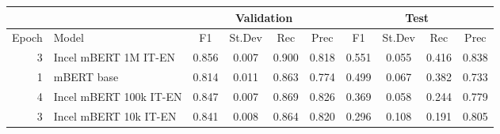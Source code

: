 \begin{tabular}{rl|cccc|cccc}
    \hline
                  &                    &  \multicolumn{4}{c|}{Validation}              & \multicolumn{4}{c}{Test} \\
    \hline
            Epoch &              Model &      F1 &      St.Dev &   Rec & Prec &       F1 &       St.Dev &  Rec   &  Prec \\
    \hline
    3 &   Incel mBERT 1M IT-EN &   0.856 &          0.007 &    0.900 &     0.818 &    0.551 &           0.055 &     0.416 &      0.838 \\
    1 &             mBERT base &   0.814 &          0.011 &    0.863 &     0.774 &    0.499 &           0.067 &     0.382 &      0.733 \\
    4 & Incel mBERT 100k IT-EN &   0.847 &          0.007 &    0.869 &     0.826 &    0.369 &           0.058 &     0.244 &      0.779 \\
    3 &  Incel mBERT 10k IT-EN &   0.841 &          0.008 &    0.864 &     0.820 &    0.296 &           0.108 &     0.191 &      0.805 \\
 \hline
\end{tabular}
